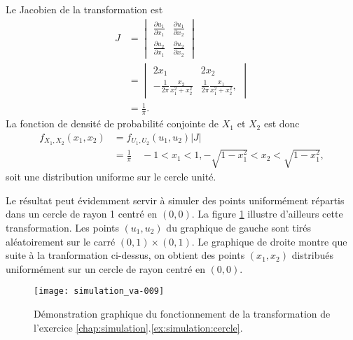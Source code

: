 \begin{exercice}
\begin{sol}
    Le Jacobien de la transformation est
    \begin{align*}
      J
      &=
      \begin{vmatrix}
        \frac{\partial u_1}{\partial x_1} &
        \frac{\partial u_1}{\partial x_2} \\
        \frac{\partial u_2}{\partial x_1} &
        \frac{\partial u_2}{\partial x_2}
      \end{vmatrix} \\
      &=
      \begin{vmatrix}
        2 x_1 &
        2 x_2 \\
        -\frac{1}{2\pi} \frac{x_2}{x_1^2 + x_2^2} &
        \frac{1}{2\pi} \frac{x_1}{x_1^2 + x_2^2},
      \end{vmatrix} \\
      &=
      \frac{1}{\pi}.
    \end{align*}
    La fonction de densité de probabilité conjointe de $X_1$ et $X_2$
    est donc
    \begin{align*}
      f_{X_1,X_2}(x_1, x_2)
      &= f_{U_1, U_2}(u_1, u_2) |J| \\
      &= \frac{1}{\pi} \quad -1 < x_1 < 1, -\sqrt{1 - x_1^2} < x_2 <
      \sqrt{1 - x_1^2},
    \end{align*}
    soit une distribution uniforme sur le cercle unité.

    Le résultat peut évidemment servir à simuler des points
    uniformément répartis dans un cercle de rayon 1 centré en $(0,
    0)$. La figure \ref{fig:simulation:cercle} illustre d'ailleurs cette
    transformation. Les points $(u_1, u_2)$ du graphique de gauche
    sont tirés aléatoirement sur le carré $(0, 1) \times (0, 1)$. Le
    graphique de droite montre que suite à la tranformation ci-dessus,
    on obtient des points $(x_1, x_2)$ distribués uniformément sur un
    cercle de rayon centré en $(0, 0)$.
    \begin{figure}
      \centering
\texttt{[image: simulation\_va-009]}
      \caption{Démonstration graphique du fonctionnement de la
        transformation de l'exercice
        \ref{chap:simulation}.\ref{ex:simulation:cercle}.}
      \label{fig:simulation:cercle}
    \end{figure}
  \end{sol}
\end{exercice}

